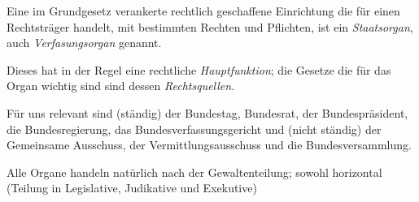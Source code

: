 \documentclass{article}
\begin{document}
Eine im Grundgesetz verankerte rechtlich geschaffene Einrichtung die für einen Rechtsträger handelt, mit bestimmten Rechten und Pflichten, ist ein \emph{Staatsorgan}, auch \emph{Verfasungsorgan} genannt.

Dieses hat in der Regel eine rechtliche \emph{Hauptfunktion}; die Gesetze die für das Organ wichtig sind sind dessen \emph{Rechtsquellen}.

Für uns relevant sind (ständig) der Bundestag, Bundesrat, der Bundespräsident, die Bundesregierung, das Bundesverfassungsgericht und (nicht ständig) der Gemeinsame Ausschuss, der Vermittlungsausschuss und die Bundesversammlung.

Alle Organe handeln natürlich nach der Gewaltenteilung; sowohl horizontal (Teilung in Legislative, Judikative und Exekutive)
\end{document}
